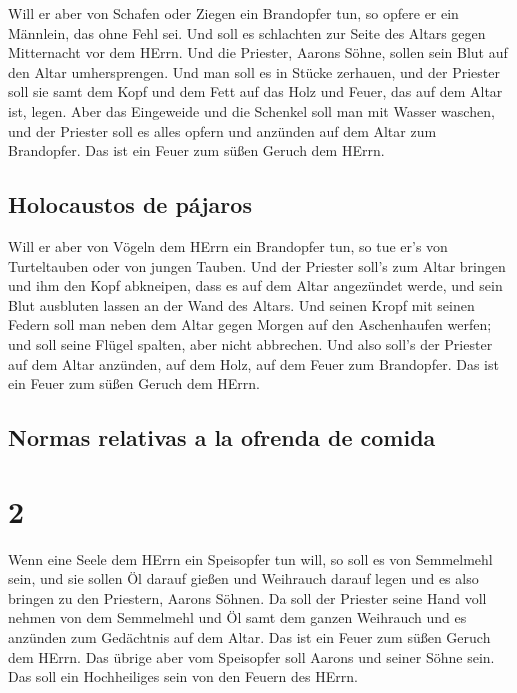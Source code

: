  Will er aber von Schafen oder Ziegen ein Brandopfer tun,
so opfere er ein Männlein, das ohne Fehl sei.  Und soll
es schlachten zur Seite des Altars gegen Mitternacht vor dem HErrn. Und
die Priester, Aarons Söhne, sollen sein Blut auf den Altar
umhersprengen.  Und man soll es in Stücke zerhauen, und
der Priester soll sie samt dem Kopf und dem Fett auf das Holz und Feuer,
das auf dem Altar ist, legen.  Aber das Eingeweide und
die Schenkel soll man mit Wasser waschen, und der Priester soll es alles
opfern und anzünden auf dem Altar zum Brandopfer. Das ist ein Feuer zum
süßen Geruch dem HErrn.

\hypertarget{holocaustos-de-puxe1jaros}{%
\subsection{Holocaustos de pájaros}\label{holocaustos-de-puxe1jaros}}

 Will er aber von Vögeln dem HErrn ein Brandopfer tun, so
tue er's von Turteltauben oder von jungen Tauben.  Und
der Priester soll's zum Altar bringen und ihm den Kopf abkneipen, dass
es auf dem Altar angezündet werde, und sein Blut ausbluten lassen an der
Wand des Altars.  Und seinen Kropf mit seinen Federn soll
man neben dem Altar gegen Morgen auf den Aschenhaufen werfen;
 und soll seine Flügel spalten, aber nicht abbrechen. Und
also soll's der Priester auf dem Altar anzünden, auf dem Holz, auf dem
Feuer zum Brandopfer. Das ist ein Feuer zum süßen Geruch dem HErrn.

\hypertarget{normas-relativas-a-la-ofrenda-de-comida}{%
\subsection{Normas relativas a la ofrenda de
comida}\label{normas-relativas-a-la-ofrenda-de-comida}}

\hypertarget{section-1}{%
\section{2}\label{section-1}}

 Wenn eine Seele dem HErrn ein Speisopfer tun will, so
soll es von Semmelmehl sein, und sie sollen Öl darauf gießen und
Weihrauch darauf legen  und es also bringen zu den
Priestern, Aarons Söhnen. Da soll der Priester seine Hand voll nehmen
von dem Semmelmehl und Öl samt dem ganzen Weihrauch und es anzünden zum
Gedächtnis auf dem Altar. Das ist ein Feuer zum süßen Geruch dem HErrn.
 Das übrige aber vom Speisopfer soll Aarons und seiner
Söhne sein. Das soll ein Hochheiliges sein von den Feuern des HErrn.


